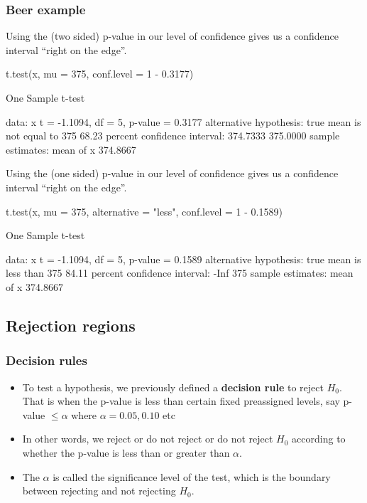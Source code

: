 \documentclass[a4paper]{article}
\begin{document}
\subsubsection{Beer example}
Using the (two sided) p-value in our level of confidence gives us a confidence interval ``right on the edge''.
\begin{Schunk}
\begin{Sinput}
t.test(x, mu = 375, conf.level = 1 - 0.3177)
\end{Sinput}
\begin{Soutput}

	One Sample t-test

data:  x
t = -1.1094, df = 5, p-value = 0.3177
alternative hypothesis: true mean is not equal to 375
68.23 percent confidence interval:
 374.7333 375.0000
sample estimates:
mean of x 
 374.8667 
\end{Soutput}
\end{Schunk}
Using the (one sided) p-value in our level of confidence gives us a confidence interval ``right on the edge''.
\begin{Schunk}
\begin{Sinput}
t.test(x, mu = 375, alternative = "less", conf.level = 1 - 0.1589)
\end{Sinput}
\begin{Soutput}

	One Sample t-test

data:  x
t = -1.1094, df = 5, p-value = 0.1589
alternative hypothesis: true mean is less than 375
84.11 percent confidence interval:
 -Inf  375
sample estimates:
mean of x 
 374.8667 
\end{Soutput}
\end{Schunk}
\subsection{Rejection regions}
\subsubsection{Decision rules}
	\begin{itemize}
		\item To test a hypothesis, we previously defined a \textbf{decision rule} to reject \( H_0 \). That is when the p-value is less than certain fixed preassigned levels, say p-value \( \leq \alpha \) where \( \alpha = 0.05, 0.10 \) etc
		\item In other words, we reject or do not reject or do not reject \( H_0 \) according to whether the p-value is less than or greater than \( \alpha \).
		\item The \( \alpha \) is called the significance level of the test, which is the boundary between rejecting and not rejecting \( H_0 \).
	\end{itemize}
\end{document}
